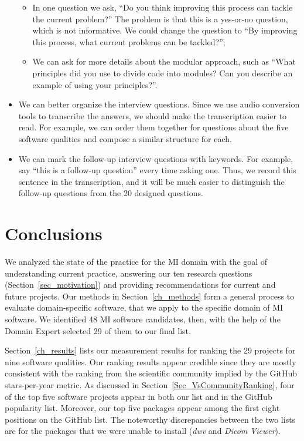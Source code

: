 \documentclass[final, 12pt, 3p, times]{elsarticle}
\begin{document}
\begin{itemize}
	\begin{itemize}
	    \item In one question we ask, ``Do you think improving this process can
	    tackle the current problem?''  The problem is that this is a yes-or-no
	    question, which is not informative. We could change the question to ``By
	    improving this process, what current problems can be tackled?''; 
	    \item We can ask for more details about the modular approach, such as
	    ``What principles did you use to divide code into modules? Can you
	    describe an example of using your principles?''.
	\end{itemize}
	\item We can better organize the interview questions. Since we use audio
	conversion tools to transcribe the answers, we should make the transcription
	easier to read. For example, we can order them together for questions about
	the five software qualities and compose a similar structure for each.
	\item We can mark the follow-up interview questions with keywords. For
	example, say ``this is a follow-up question'' every time asking one. Thus,
	we record this sentence in the transcription, and it will be much easier to
	distinguish the follow-up questions from the 20 designed questions.
\end{itemize}

\section{Conclusions} \label{ch_conclusions}

We analyzed the state of the practice for the MI domain with the goal of
understanding current practice, answering our ten research questions
(Section~\ref{sec_motivation}) and providing recommendations for current and
future projects.  Our methods in Section~\ref{ch_methods} form a general process
to evaluate domain-specific software, that we apply to the specific domain of MI
software. We identified 48 MI software candidates, then, with the help of the
Domain Expert selected 29 of them to our final list. 

Section~\ref{ch_results} lists our measurement results for ranking the 29
projects for nine software qualities. Our ranking results appear credible since
they are mostly consistent with the ranking from the scientific community
implied by the GitHub stars-per-year metric. As discussed in
Section~\ref{Sec_VsCommunityRanking}, four of the top five software projects
appear in both our list and in the GitHub popularity list.  Moreover, our top
five packages appear among the first eight positions on the GitHub list.  The
noteworthy discrepancies between the two lists are for the packages that we were
unable to install (\textit{dwv} and \textit{Dicom Viewer}).
\end{document}
